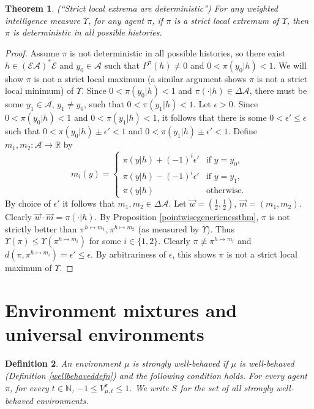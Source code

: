 \documentclass[twoside]{article}
\newtheorem{theorem}{Theorem}
\newtheorem{definition}[theorem]{Definition}
\begin{document}
\begin{theorem}
    (``Strict local extrema are deterministic'')
    For any weighted intelligence measure $\Upsilon$, for any agent $\pi$,
    if $\pi$ is a strict local extremum of $\Upsilon$, then
    $\pi$ is deterministic in all possible histories.
\end{theorem}

\begin{proof}
    Assume $\pi$ is not deterministic in all possible histories, so there exist
    $h\in(\mathcal E\mathcal A)^*\mathcal E$ and $y_0\in\mathcal A$
    such that $P^\pi(h)\not=0$ and $0<\pi(y_0|h)<1$.
    We will show $\pi$ is not a strict local maximum (a similar argument
    shows $\pi$ is not a strict local minimum) of $\Upsilon$.
    Since $0<\pi(y_0|h)<1$ and $\pi(\cdot|h)\in\Delta\mathcal A$,
    there must be some $y_1\in\mathcal A$, $y_1\not=y_0$, such that
    $0<\pi(y_1|h)<1$. Let $\epsilon>0$.
    Since $0<\pi(y_0|h)<1$ and $0<\pi(y_1|h)<1$, it follows
    that there is some $0<\epsilon'\leq \epsilon$
    such that $0<\pi(y_0|h)\pm\epsilon'<1$ and $0<\pi(y_1|h)\pm\epsilon'<1$.
    Define $m_1,m_2:\mathcal A\to \mathbb R$ by
    \[
        m_i(y) = \begin{cases}
            \pi(y|h)+(-1)^i\epsilon' &\mbox{if $y=y_0$,}\\
            \pi(y|h)-(-1)^i\epsilon' &\mbox{if $y=y_1$,}\\
            \pi(y|h) &\mbox{otherwise.}
        \end{cases}
    \]
    By choice of $\epsilon'$ it follows that $m_1,m_2\in\Delta\mathcal A$.
    Let $\vec w=(\frac12,\frac12)$, $\vec m=(m_1,m_2)$.
    Clearly $\vec w\cdot\vec m=\pi(\cdot|h)$.
    By Proposition \ref{pointwisegenericnessthm},
    $\pi$ is not strictly better than $\pi^{h\mapsto m_1},\pi^{h\mapsto m_2}$
    (as measured by $\Upsilon$).
    Thus $\Upsilon(\pi)\leq \Upsilon(\pi^{h\mapsto m_i})$
    for some $i\in\{1,2\}$.
    Clearly $\pi\not\equiv \pi^{h\mapsto m_i}$
    and $d(\pi,\pi^{h\mapsto m_i})=\epsilon'\leq\epsilon$.
    By arbitrariness of $\epsilon$, this shows
    $\pi$ is not a strict local maximum of $\Upsilon$.
\end{proof}

\section{Environment mixtures and universal environments}

\begin{definition}
\label{wprimedefn}
    An environment $\mu$ is \emph{strongly well-behaved} if $\mu$ is well-behaved
    (Definition \ref{wellbehaveddefn}) and the following condition holds.
    For every agent $\pi$, for every $t\in\mathbb N$,
    $-1\leq V^\pi_{\mu,t}\leq 1$. We write $S$ for the set of all
    strongly well-behaved environments.
\end{definition}
\end{document}
